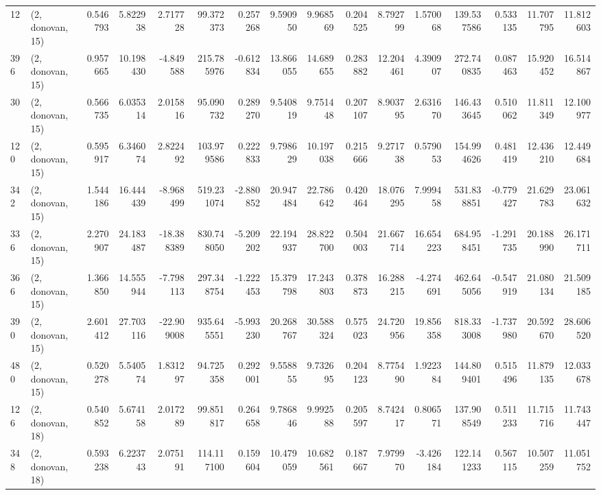 \begin{tabular}{llrrrrrrrrrrrrrr}
12  &  (2, donovan, 15) &   0.546793 &   5.822938 &   2.717728 &    99.372373 &   0.257268 &   9.590950 &   9.968569 &  0.204525 &   8.792799 &   1.570068 &   139.537586 &   0.533135 &  11.707795 &  11.812603 \\
396 &  (2, donovan, 15) &   0.957665 &  10.198430 &  -4.849588 &   215.785976 &  -0.612834 &  13.866055 &  14.689655 &  0.283882 &  12.204461 &   4.390907 &   272.740835 &   0.087463 &  15.920452 &  16.514867 \\
30  &  (2, donovan, 15) &   0.566735 &   6.035314 &   2.015816 &    95.090732 &   0.289270 &   9.540819 &   9.751448 &  0.207107 &   8.903795 &   2.631670 &   146.433645 &   0.510062 &  11.811349 &  12.100977 \\
120 &  (2, donovan, 15) &   0.595917 &   6.346074 &   2.822492 &   103.979586 &   0.222833 &   9.798629 &  10.197038 &  0.215666 &   9.271738 &   0.579053 &   154.994626 &   0.481419 &  12.436210 &  12.449684 \\
342 &  (2, donovan, 15) &   1.544186 &  16.444439 &  -8.968499 &   519.231074 &  -2.880852 &  20.947484 &  22.786642 &  0.420464 &  18.076295 &   7.999458 &   531.838851 &  -0.779427 &  21.629783 &  23.061632 \\
336 &  (2, donovan, 15) &   2.270907 &  24.183487 & -18.388389 &   830.748050 &  -5.209202 &  22.194937 &  28.822700 &  0.504003 &  21.667714 &  16.654223 &   684.958451 &  -1.291735 &  20.188990 &  26.171711 \\
366 &  (2, donovan, 15) &   1.366850 &  14.555944 &  -7.798113 &   297.348754 &  -1.222453 &  15.379798 &  17.243803 &  0.378873 &  16.288215 &  -4.274691 &   462.645056 &  -0.547919 &  21.080134 &  21.509185 \\
390 &  (2, donovan, 15) &   2.601412 &  27.703116 & -22.909008 &   935.645551 &  -5.993230 &  20.268767 &  30.588324 &  0.575023 &  24.720956 &  19.856358 &   818.333008 &  -1.737980 &  20.592670 &  28.606520 \\
480 &  (2, donovan, 15) &   0.520278 &   5.540574 &   1.831297 &    94.725358 &   0.292001 &   9.558855 &   9.732695 &  0.204123 &   8.775490 &   1.922384 &   144.809401 &   0.515496 &  11.879135 &  12.033678 \\
126 &  (2, donovan, 18) &   0.540852 &   5.674158 &   2.017289 &    99.851817 &   0.264658 &   9.786846 &   9.992588 &  0.205597 &   8.742417 &   0.806571 &   137.908549 &   0.511233 &  11.715716 &  11.743447 \\
348 &  (2, donovan, 18) &   0.593238 &   6.223743 &   2.075191 &   114.117100 &   0.159604 &  10.479059 &  10.682561 &  0.187667 &   7.979970 &  -3.426184 &   122.141233 &   0.567115 &  10.507259 &  11.051752 \\

\end{tabular}
